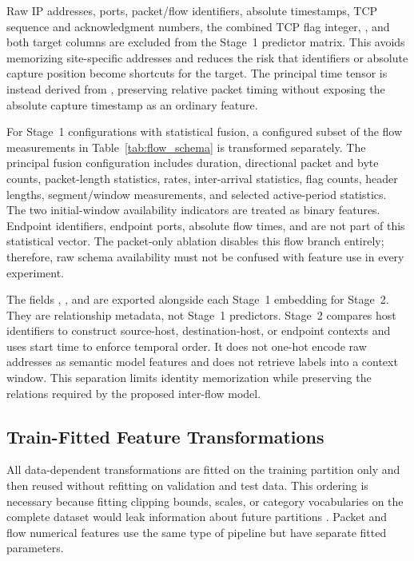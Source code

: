 Raw IP addresses, ports, packet/flow identifiers, absolute timestamps, TCP
sequence and acknowledgment numbers, the combined TCP flag integer,
, and both target columns are excluded from the Stage~1
predictor matrix. This avoids memorizing site-specific addresses and reduces
the risk that identifiers or absolute capture position become shortcuts for
the target. The principal time tensor is instead derived from
, preserving relative packet timing without exposing
the absolute capture timestamp as an ordinary feature.

For Stage~1 configurations with statistical fusion, a configured subset of the
flow measurements in Table~\ref{tab:flow_schema} is transformed separately.
The principal fusion configuration includes duration, directional packet and
byte counts, packet-length statistics, rates, inter-arrival statistics, flag
counts, header lengths, segment/window measurements, and selected active-period
statistics. The two initial-window availability indicators are treated as
binary features. Endpoint identifiers, endpoint ports, absolute flow times,
and  are not part of this statistical vector. The
packet-only ablation disables this flow branch entirely; therefore, raw schema
availability must not be confused with feature use in every experiment.

The fields , ,
and  are exported alongside each Stage~1
embedding for Stage~2. They are relationship metadata, not Stage~1 predictors.
Stage~2 compares host identifiers to construct source-host,
destination-host, or endpoint contexts and uses start time to enforce temporal
order. It does not one-hot encode raw addresses as semantic model features and
does not retrieve labels into a context window. This separation limits
identity memorization while preserving the relations required by the proposed
inter-flow model.

\subsection{Train-Fitted Feature Transformations}
\label{subsec:feature_transformations}

All data-dependent transformations are fitted on the training partition only
and then reused without refitting on validation and test data. This ordering is
necessary because fitting clipping bounds, scales, or category vocabularies on
the complete dataset would leak information about future partitions
\cite{Arp2022DosDonts}. Packet and flow numerical features use the same type of
pipeline but have separate fitted parameters.

